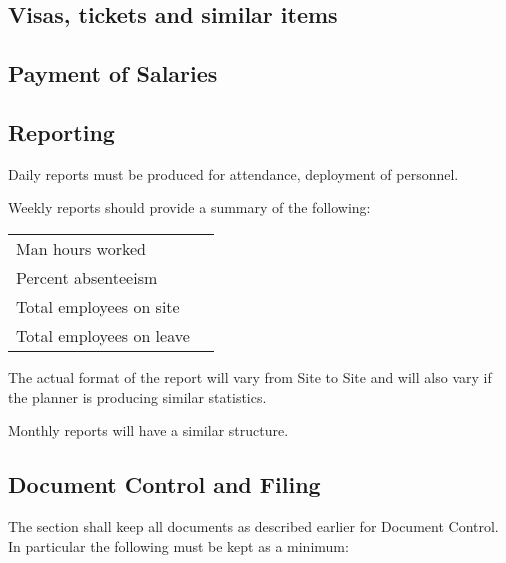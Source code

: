 \subsection{Visas, tickets and similar items}

\subsection{Payment of Salaries}

\subsection{Reporting}

Daily reports must be produced for attendance, deployment of personnel.

Weekly reports should provide a summary of the following:

\begin{tabular}{ll}
Man hours worked          &\\
Percent absenteeism       &\\
Total employees on site   &\\
Total employees on leave &\\
\end{tabular}

The actual format of the report will vary from Site to Site and will also vary if the planner is producing 
similar statistics.

Monthly reports will have a similar structure.

\subsection*{Document Control and Filing}

The section shall keep all documents as described earlier for Document Control. In particular the
following must be kept as a minimum:

